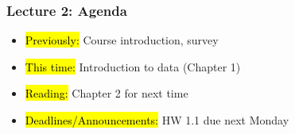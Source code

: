 
\begin{frame}
    \frametitle{Lecture 2: Agenda}
    \begin{itemize}
        \item \hl{Previously: }Course introduction, survey
        \item \hl{This time: }Introduction to data (Chapter 1)
        \item \hl{Reading: }Chapter 2 for next time
        \item \hl{Deadlines/Announcements: }HW 1.1 due next Monday
    \end{itemize}
    
\end{frame}
    
